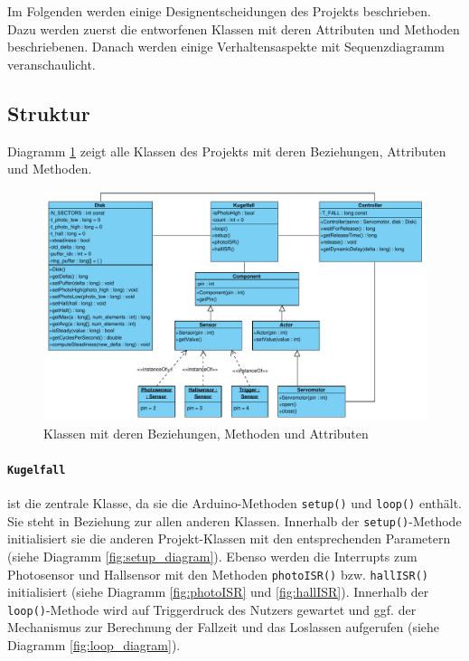 \newcommand{\class}[1]{\texttt{#1}}
\newcommand{\method}[1]{\texttt{#1}}
\newcommand{\attr}[1]{\textit{#1}}

Im Folgenden werden einige Designentscheidungen des Projekts beschrieben.
Dazu werden zuerst die entworfenen Klassen mit deren Attributen und Methoden beschriebenen.
Danach werden einige Verhaltensaspekte mit Sequenzdiagramm veranschaulicht.

\subsection{Struktur}
Diagramm \ref{fig:class_diagramm} zeigt alle Klassen des Projekts mit deren Beziehungen, Attributen und Methoden.


\begin{figure}[htbp]
	\centering
	\includegraphics[width=\textwidth]{abb/class_cropped}
	\caption{Klassen mit deren Beziehungen, Methoden und Attributen}
	\label{fig:class_diagramm}
\end{figure}

\paragraph{\class{Kugelfall}}
ist die zentrale Klasse, da sie die Arduino-Methoden \method{setup()} und \method{loop()} enthält.
Sie steht in Beziehung zur allen anderen Klassen.
Innerhalb der \method{setup()}-Methode initialisiert sie die anderen Projekt-Klassen mit den entsprechenden Parametern (siehe Diagramm \ref{fig:setup_diagram}).
Ebenso werden die Interrupts zum Photosensor und Hallsensor mit den Methoden \method{photoISR()} bzw. \method{hallISR()} initialisiert (siehe Diagramm \ref{fig:photoISR} und \ref{fig:hallISR}).
Innerhalb der \method{loop()}-Methode wird auf Triggerdruck des Nutzers gewartet und ggf. der Mechanismus zur Berechnung der Fallzeit und das Loslassen aufgerufen (siehe Diagramm \ref{fig:loop_diagram}).

